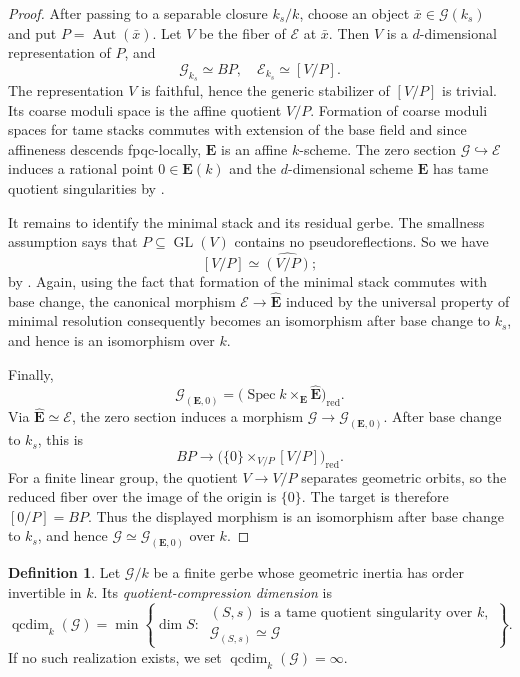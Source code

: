 \documentclass[11pt,reqno]{amsart}
\numberwithin{equation}{section}
\theoremstyle{plain}
\theoremstyle{definition}
\newtheorem{defi}[prop]{Definition}
\def\cG{{\mathcal G}}
\def\cE{{\mathcal E}}
\def\bfE{{\mathbf E}}
\def\Spec{{\operatorname{Spec}}}
\def\Aut{{\operatorname{Aut}}}
\def\GL{{\operatorname{GL}}}
\begin{document}
\begin{proof}
After passing to a separable closure
$k_s/k$, choose an object $\bar x\in\cG(k_s)$ and put
$P=\Aut(\bar x)$.  Let $V$ be the fiber of $\cE$ at $\bar x$.  Then $V$ is a
$d$-dimensional representation of $P$, and
\[
\cG_{k_s}\simeq BP,
\quad
\cE_{k_s}\simeq[V/P].
\]
The representation $V$ is faithful, hence the generic stabilizer of
$[V/P]$ is trivial.  Its coarse moduli space is the affine quotient $V/P$.
Formation of coarse moduli spaces for tame stacks commutes with extension of
the base field and since affineness descends fpqc-locally, $\bfE$ is an affine $k$-scheme. The zero section $\cG\hookrightarrow\cE$ induces a rational point $0\in\bfE(k)$ and the $d$-dimensional scheme $\bfE$ has tame quotient singularities by
\cite[Proposition~6.1]{Bresciani_Vistoli_2024}.

It remains to identify the minimal stack and its residual gerbe.  The
smallness assumption says that $P\subseteq\GL(V)$ contains no
pseudoreflections. So we have
\[
[V/P]\simeq\widehat{(V/P)};
\]
by \cite[Lemma~6.3]{Bresciani_Vistoli_2024}. Again, using the fact that formation of the minimal
stack commutes with base change, the canonical morphism
$\cE\to\widehat{\bfE}$ induced by the universal property of minimal resolution consequently becomes an isomorphism after base change
to $k_s$, and hence is an isomorphism over $k$.

Finally,
\[
\cG_{(\bfE,0)}
=
\bigl(\Spec k\times_{\bfE}\widehat{\bfE}\bigr)_{\mathrm{red}}.
\]
Via $\widehat{\bfE}\simeq\cE$, the zero section induces a morphism
$\cG\to\cG_{(\bfE,0)}$.  After base change to $k_s$, this is
\[
BP\longrightarrow
\bigl(\{0\}\times_{V/P}[V/P]\bigr)_{\mathrm{red}}.
\]
For a finite linear group, the quotient $V\to V/P$ separates geometric
orbits, so the reduced fiber over the image of the origin is $\{0\}$.  The
target is therefore $[0/P]=BP$.  Thus the displayed morphism is an
isomorphism after base change to $k_s$, and hence
$\cG\simeq\cG_{(\bfE,0)}$ over $k$.
\end{proof}

\begin{defi}\label{def:qcdim}
Let $\cG/k$ be a finite gerbe whose geometric inertia has order invertible in
$k$.  Its \emph{quotient-compression dimension} is
\[
\operatorname{qcdim}_k(\cG)
=
\min\left\{\dim S:\
\begin{array}{l}
(S,s)\text{ is a tame quotient singularity over }k,\\
\cG_{(S,s)}\simeq\cG
\end{array}
\right\}.
\]
If no such realization exists, we set $\operatorname{qcdim}_k(\cG)=\infty$.
\end{defi}
\end{document}
